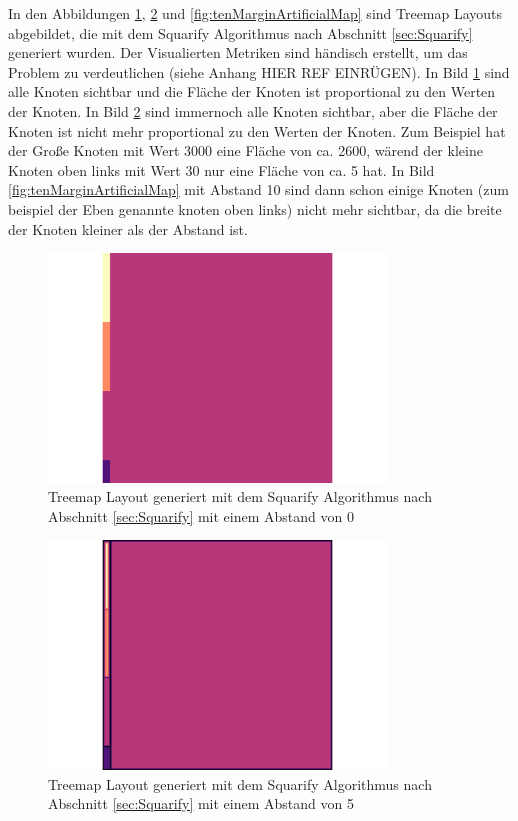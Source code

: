 In den Abbildungen \ref{fig:zeroMarginArtificialMap}, \ref{fig:fiveMarginArtificialMap} und \ref{fig:tenMarginArtificialMap} sind Treemap Layouts abgebildet, die mit dem Squarify Algorithmus nach Abschnitt \ref{sec:Squarify} generiert wurden. Der Visualierten Metriken sind händisch erstellt, um das Problem zu verdeutlichen (siehe Anhang HIER REF EINRÜGEN). In Bild \ref{fig:zeroMarginArtificialMap} sind alle Knoten sichtbar und die Fläche der Knoten ist proportional zu den Werten der Knoten. In Bild \ref{fig:fiveMarginArtificialMap} sind immernoch alle Knoten sichtbar, aber die Fläche der Knoten ist nicht mehr proportional zu den Werten der Knoten. Zum Beispiel hat der Große Knoten mit Wert 3000 eine Fläche von ca. 2600, wärend der kleine Knoten oben links mit Wert 30 nur eine Fläche von ca. 5 hat. In Bild \ref{fig:tenMarginArtificialMap} mit Abstand 10 sind dann schon einige Knoten (zum beispiel der Eben genannte knoten oben links) nicht mehr sichtbar, da die breite der Knoten kleiner als der Abstand ist. 

\begin{figure}
    \centering
    \includegraphics[width=0.8\textwidth]{images/zeroMarginArtificialMap.png}
    \caption{Treemap Layout generiert mit dem Squarify Algorithmus nach Abschnitt \ref{sec:Squarify} mit einem Abstand von 0} 
    \label{fig:zeroMarginArtificialMap}
\end{figure}

\begin{figure}
    \centering
    \includegraphics[width=0.8\textwidth]{images/fiveMarginArtifialMap.png}
    \caption{Treemap Layout generiert mit dem Squarify Algorithmus nach Abschnitt \ref{sec:Squarify} mit einem Abstand von 5} 
    \label{fig:fiveMarginArtificialMap}
\end{figure}

